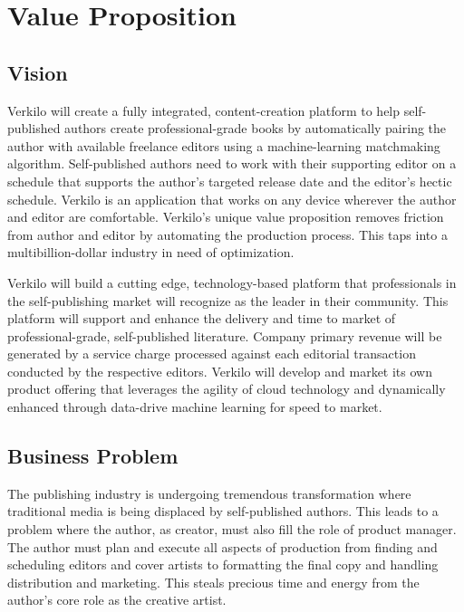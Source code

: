 \documentclass[10pt,openany]{book}
\begin{document}
\hypertarget{value-proposition}{%
\chapter{Value Proposition}\label{value-proposition}}

\hypertarget{vision}{%
\section{Vision}\label{vision}}

Verkilo will create a fully integrated, content-creation platform to
help self-published authors create professional-grade books by
automatically pairing the author with available freelance editors using
a machine-learning matchmaking algorithm. Self-published authors need to
work with their supporting editor on a schedule that supports the
author's targeted release date and the editor's hectic schedule. Verkilo
is an application that works on any device wherever the author and
editor are comfortable. Verkilo's unique value proposition removes
friction from author and editor by automating the production process.
This taps into a multibillion-dollar industry in need of optimization.

Verkilo will build a cutting edge, technology-based platform that
professionals in the self-publishing market will recognize as the leader
in their community. This platform will support and enhance the delivery
and time to market of professional-grade, self-published literature.
Company primary revenue will be generated by a service charge processed
against each editorial transaction conducted by the respective editors.
Verkilo will develop and market its own product offering that leverages
the agility of cloud technology and dynamically enhanced through
data-drive machine learning for speed to market.

\hypertarget{business-problem}{%
\section{Business Problem}\label{business-problem}}

The publishing industry is undergoing tremendous transformation where
traditional media is being displaced by self-published authors. This
leads to a problem where the author, as creator, must also fill the role
of product manager. The author must plan and execute all aspects of
production from finding and scheduling editors and cover artists to
formatting the final copy and handling distribution and marketing. This
steals precious time and energy from the author's core role as the
creative artist.
\end{document}
